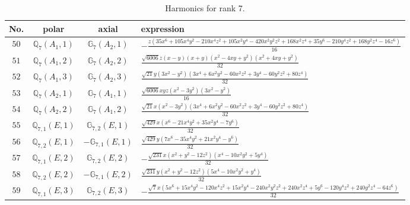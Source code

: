 \documentclass[fleqn,8pt,landscape]{jsarticle}
\begin{document}
\begin{table}[ht!]
\begin{center}
\caption{Harmonics for rank 7.}
\renewcommand{\arraystretch}{1.3}
\begin{tabular}{cccl} \hline \hline
No. & polar & axial & expression \\ \hline
$ 50 $ & $ \mathbb{Q}_{7}(A_{1},1) $ & $ \mathbb{G}_{7}(A_{2},1) $ & $ - \frac{z \left(35 x^{6} + 105 x^{4} y^{2} - 210 x^{4} z^{2} + 105 x^{2} y^{4} - 420 x^{2} y^{2} z^{2} + 168 x^{2} z^{4} + 35 y^{6} - 210 y^{4} z^{2} + 168 y^{2} z^{4} - 16 z^{6}\right)}{16} $ \\
$ 51 $ & $ \mathbb{Q}_{7}(A_{1},2) $ & $ \mathbb{G}_{7}(A_{2},2) $ & $ \frac{\sqrt{6006} z \left(x - y\right) \left(x + y\right) \left(x^{2} - 4 x y + y^{2}\right) \left(x^{2} + 4 x y + y^{2}\right)}{32} $ \\
$ 52 $ & $ \mathbb{Q}_{7}(A_{1},3) $ & $ \mathbb{G}_{7}(A_{2},3) $ & $ \frac{\sqrt{21} y \left(3 x^{2} - y^{2}\right) \left(3 x^{4} + 6 x^{2} y^{2} - 60 x^{2} z^{2} + 3 y^{4} - 60 y^{2} z^{2} + 80 z^{4}\right)}{32} $ \\
$ 53 $ & $ \mathbb{Q}_{7}(A_{2},1) $ & $ \mathbb{G}_{7}(A_{1},1) $ & $ \frac{\sqrt{6006} x y z \left(x^{2} - 3 y^{2}\right) \left(3 x^{2} - y^{2}\right)}{16} $ \\
$ 54 $ & $ \mathbb{Q}_{7}(A_{2},2) $ & $ \mathbb{G}_{7}(A_{1},2) $ & $ \frac{\sqrt{21} x \left(x^{2} - 3 y^{2}\right) \left(3 x^{4} + 6 x^{2} y^{2} - 60 x^{2} z^{2} + 3 y^{4} - 60 y^{2} z^{2} + 80 z^{4}\right)}{32} $ \\
$ 55 $ & $ \mathbb{Q}_{7,1}(E,1) $ & $ \mathbb{G}_{7,2}(E,1) $ & $ \frac{\sqrt{429} x \left(x^{6} - 21 x^{4} y^{2} + 35 x^{2} y^{4} - 7 y^{6}\right)}{32} $ \\
$ 56 $ & $ \mathbb{Q}_{7,2}(E,1) $ & $ -\mathbb{G}_{7,1}(E,1) $ & $ \frac{\sqrt{429} y \left(7 x^{6} - 35 x^{4} y^{2} + 21 x^{2} y^{4} - y^{6}\right)}{32} $ \\
$ 57 $ & $ \mathbb{Q}_{7,1}(E,2) $ & $ \mathbb{G}_{7,2}(E,2) $ & $ - \frac{\sqrt{231} x \left(x^{2} + y^{2} - 12 z^{2}\right) \left(x^{4} - 10 x^{2} y^{2} + 5 y^{4}\right)}{32} $ \\
$ 58 $ & $ \mathbb{Q}_{7,2}(E,2) $ & $ -\mathbb{G}_{7,1}(E,2) $ & $ \frac{\sqrt{231} y \left(x^{2} + y^{2} - 12 z^{2}\right) \left(5 x^{4} - 10 x^{2} y^{2} + y^{4}\right)}{32} $ \\
$ 59 $ & $ \mathbb{Q}_{7,1}(E,3) $ & $ \mathbb{G}_{7,2}(E,3) $ & $ - \frac{\sqrt{7} x \left(5 x^{6} + 15 x^{4} y^{2} - 120 x^{4} z^{2} + 15 x^{2} y^{4} - 240 x^{2} y^{2} z^{2} + 240 x^{2} z^{4} + 5 y^{6} - 120 y^{4} z^{2} + 240 y^{2} z^{4} - 64 z^{6}\right)}{32} $ \\

\end{tabular}
\end{center}
\end{table}
\end{document}
